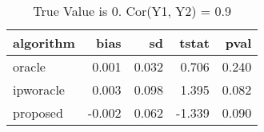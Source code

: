 \begin{table}[h!]

\caption{True Value is 0. Cor(Y1, Y2) = 0.9}
\centering
\begin{tabular}[t]{lrrrr}
\toprule
algorithm & bias & sd & tstat & pval\\
\midrule
oracle & 0.001 & 0.032 & 0.706 & 0.240\\
ipworacle & 0.003 & 0.098 & 1.395 & 0.082\\
proposed & -0.002 & 0.062 & -1.339 & 0.090\\
\bottomrule
\end{tabular}
\end{table}

